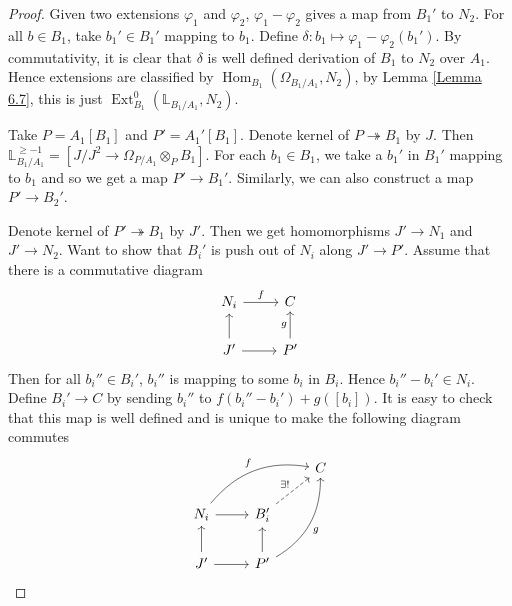 \documentclass{ctexart}
\renewcommand{\hom}{\operatorname{Hom}}
\newcommand{\ext}{\operatorname{Ext}}
\begin{document}
\begin{proof}
    Given two extensions $\varphi_{1}$ and $\varphi_{2}$, $\varphi_{1} - \varphi_{2}$ gives a map from $B_{1}'$ to $N_{2}$.
    For all $b\in B_{1}$, take $b_{1}'\in B_{1}'$ mapping to $b_{1}$.
    Define $\delta: b_{1} \mapsto \varphi_{1} - \varphi_{2}(b_{1}')$.
    By commutativity, it is clear that $\delta$ is well defined derivation of $B_{1}$ to $N_{2}$ over $A_{1}$.
    Hence extensions are classified by $\hom_{B_{1}}(\Omega_{B_{1}/A_{1}}, N_{2})$, 
    by Lemma \ref{Lemma 6.7}, this is just $\ext_{B_{1}}^{0}(\mathbb{L}_{B_{1}/A_{1}}, N_{2})$.
    \par
    Take $P = A_{1}[B_{1}]$ and $P' = A_{1}'[B_{1}]$.
    Denote kernel of $P \twoheadrightarrow B_{1}$ by $J$.
    Then $\mathbb{L}_{B_{1}/A_{1}}^{\ge -1} = [J/J^{2} \rightarrow \Omega_{P/A_{1}} \otimes_{P} B_{1}]$.
    For each $b_{1}\in B_{1}$, we take a $b_{1}'$ in $B_{1}'$ mapping to $b_{1}$ and so we get a map $P' \rightarrow B_{1}'$.
    Similarly, we can also construct a map $P' \rightarrow B_{2}'$.
    \par
    Denote kernel of $P' \twoheadrightarrow B_{1}$ by $J'$.
    Then we get homomorphisms $J' \rightarrow N_{1}$ and $J' \rightarrow N_{2}$.
    Want to show that $B_{i}'$ is push out of $N_{i}$ along $J' \rightarrow P'$.
    Assume that there is a commutative diagram
    \begin{equation}
        \begin{tikzcd}
            N_{i} \arrow[r, "f"] &
            C \\
            J' \arrow[u] \arrow[r] &
            P' \arrow[u, "g"] 
        \end{tikzcd}
    \end{equation}
    Then for all $b_{i}''\in B_{i}'$, $b_{i}''$ is mapping to some $b_{i}$ in $B_{i}$.
    Hence $b_{i}'' - b_{i}'\in N_{i}$.
    Define $B_{i}' \rightarrow C$ by sending $b_{i}''$ to $f(b_{i}'' - b_{i}') + g([b_{i}])$.
    It is easy to check that this map is well defined and is unique to make the following diagram commutes
    \begin{equation}
        \begin{tikzcd}
            && C \\
            N_{i} \arrow[urr, "f", bend left] \arrow[r] &
            B_{i}' \arrow[ur, dashrightarrow, "\exists!"] & \\
            J' \arrow[u] \arrow[r] &
            P' \arrow[u] \arrow[uur, "g" swap, bend right] &
        \end{tikzcd}

\end{equation}
\end{proof}
\end{document}
